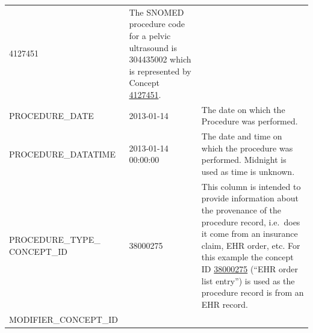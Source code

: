\documentclass[11pt]{book}
\theoremstyle{definition}
\theoremstyle{definition}
\theoremstyle{definition}
\theoremstyle{remark}
\begin{document}
\begin{longtable}[]{@{}lll@{}}
\begin{minipage}[t]{0.15\columnwidth}
4127451\strut
\end{minipage} & \begin{minipage}[t]{0.49\columnwidth}\raggedright
The SNOMED procedure code for a pelvic ultrasound is 304435002 which is represented by Concept \href{http://athena.ohdsi.org/search-terms/terms/4127451}{4127451}.\strut
\end{minipage}\tabularnewline
\begin{minipage}[t]{0.28\columnwidth}\raggedright
PROCEDURE\_DATE\strut
\end{minipage} & \begin{minipage}[t]{0.15\columnwidth}\raggedright
2013-01-14\strut
\end{minipage} & \begin{minipage}[t]{0.49\columnwidth}\raggedright
The date on which the Procedure was performed.\strut
\end{minipage}\tabularnewline
\begin{minipage}[t]{0.28\columnwidth}\raggedright
PROCEDURE\_DATATIME\strut
\end{minipage} & \begin{minipage}[t]{0.15\columnwidth}\raggedright
2013-01-14 00:00:00\strut
\end{minipage} & \begin{minipage}[t]{0.49\columnwidth}\raggedright
The date and time on which the procedure was performed. Midnight is used as time is unknown.\strut
\end{minipage}\tabularnewline
\begin{minipage}[t]{0.28\columnwidth}\raggedright
PROCEDURE\_TYPE\_ CONCEPT\_ID\strut
\end{minipage} & \begin{minipage}[t]{0.15\columnwidth}\raggedright
38000275\strut
\end{minipage} & \begin{minipage}[t]{0.49\columnwidth}\raggedright
This column is intended to provide information about the provenance of the procedure record, i.e.~does it come from an insurance claim, EHR order, etc. For this example the concept ID \href{http://athena.ohdsi.org/search-terms/terms/38000275}{38000275} (``EHR order list entry'') is used as the procedure record is from an EHR record.\strut
\end{minipage}\tabularnewline
\begin{minipage}[t]{0.28\columnwidth}\raggedright
MODIFIER\_CONCEPT\_ID\strut
\end{minipage} & \begin{minipage}[t]{0.15\columnwidth}\raggedright

\end{minipage}
\end{longtable}
\end{document}

